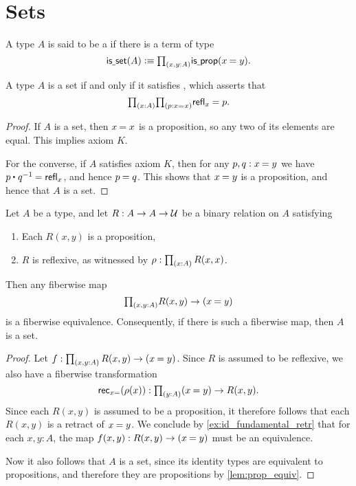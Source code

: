 \section{Sets}

\begin{defn}
A type $A$ is said to be a  if there is a term of type
\begin{equation*}
\isset(A)\defeq \prd{x,y:A}\isprop(\id{x}{y}).
\end{equation*}
\end{defn}

\begin{lem}
A type $A$ is a set if and only if it satisfies , which asserts that
\begin{equation*}
\prd{x:A}{p:\id{x}{x}}\id{\refl{x}}{p}.
\end{equation*}
\end{lem}

\begin{proof}
If $A$ is a set, then $\id{x}{x}$ is a proposition, so any two of its elements are equal. 
This implies axiom $K$. 

For the converse, if $A$ satisfies axiom $K$, then for any $p,q:\id{x}{y}$ we have $\id{\ct{p}{q^{-1}}}{\refl{x}}$, and hence $\id{p}{q}$. This shows that $\id{x}{y}$ is a proposition, and hence that $A$ is a set.
\end{proof}

\begin{lem}\label{lem:prop_to_id}
Let $A$ be a type, and let $R:A\to A\to\mathcal{U}$ be a binary relation on $A$ satisfying
\begin{enumerate}
\item Each $R(x,y)$ is a proposition,
\item $R$ is reflexive, as witnessed by $\rho:\prd{x:A}R(x,x)$.
\end{enumerate}
Then any fiberwise map
\begin{equation*}
\prd{x,y:A}R(x,y)\to (\id{x}{y})
\end{equation*}
is a fiberwise equivalence. Consequently, if there is such a fiberwise map, then $A$ is a set.
\end{lem}

\begin{proof}
Let $f:\prd{x,y:A}R(x,y)\to(\id{x}{y})$. 
Since $R$ is assumed to be reflexive, we also have a fiberwise transformation
\begin{equation*}
\rec{x=}(\rho(x)):\prd{y:A}(\id{x}{y})\to R(x,y).
\end{equation*}
Since each $R(x,y)$ is assumed to be a proposition, it therefore follows that each $R(x,y)$ is a retract of $\id{x}{y}$. We conclude by \autoref{ex:id_fundamental_retr} that for each $x,y:A$, the map $f(x,y):R(x,y)\to(\id{x}{y})$ must be an equivalence.

Now it also follows that $A$ is a set, since its identity types are equivalent to propositions, and therefore they are propositions by \cref{lem:prop_equiv}. 
\end{proof}

